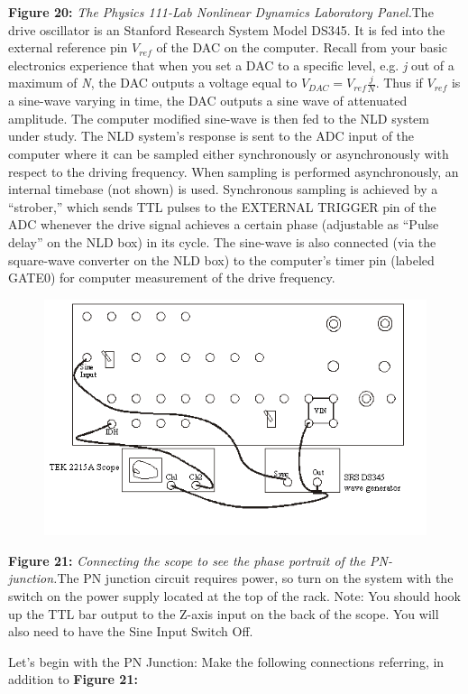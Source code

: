 \documentclass{../lab}
\begin{document}
\textbf{Figure 20:} \emph{The Physics 111-Lab Nonlinear Dynamics Laboratory Panel.}The drive oscillator is an Stanford Research System Model DS345. It is fed into the external reference pin $ V_{ref} $ of the DAC on the computer. Recall from your basic electronics experience that when you set a DAC to a specific level, e.g. \emph{j} out of a maximum of \emph{N}, the DAC outputs a voltage equal to $ V_{DAC}=V_{ref}\frac {j}{N} $. Thus if $ V_{ref} $ is a sine-wave varying in time, the DAC outputs a sine wave of attenuated amplitude. The computer modified sine-wave is then fed to the NLD system under study. The NLD system's response is sent to the ADC input of the computer where it can be sampled either synchronously or asynchronously with respect to the driving frequency. When sampling is performed asynchronously, an internal timebase (not shown) is used. Synchronous sampling is achieved by a ``strober,'' which sends TTL pulses to the EXTERNAL TRIGGER pin of the ADC whenever the drive signal achieves a certain phase (adjustable as ``Pulse delay'' on the NLD box) in its cycle. The sine-wave is also connected (via the square-wave converter on the NLD box) to the computer's timer pin (labeled GATE0) for computer measurement of the drive frequency.


\begin{figure}[h]
    \centering
    \href{http://experimentationlab.berkeley.edu/sites/default/files/images/Nldimage120.png}{\includegraphics[width=0.5\linewidth]{images/Nldimage120.png}}
    \caption{}
    \label{fig:Nldimage120}
\end{figure}

\textbf{Figure 21:} \emph{Connecting the scope to see the phase portrait of the PN-junction.}The PN junction circuit requires power, so turn on the system with the switch on the power supply located at the top of the rack. Note: You should hook up the TTL bar output to the Z-axis input on the back of the scope. You will also need to have the Sine Input Switch Off.

Let's begin with the PN Junction: Make the following connections referring, in addition to \textbf{Figure 21:}
\end{document}
